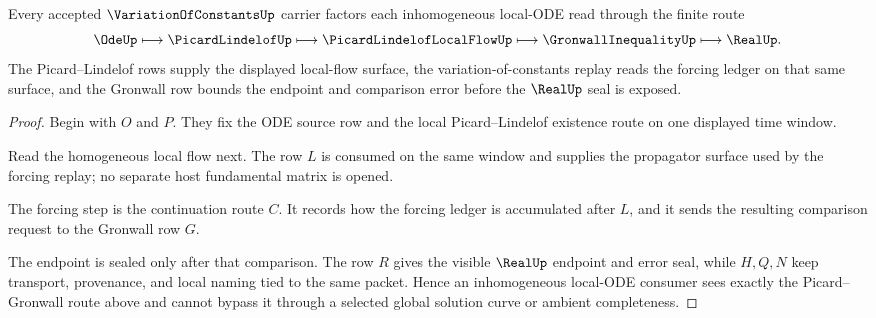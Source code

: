 \begin{theorem}
\label{thm:variation-of-constants-picard-gronwall-handoff}
Every accepted $\VariationOfConstantsUp$ carrier factors each inhomogeneous local-ODE read through the finite route
$$
\OdeUp \longmapsto \PicardLindelofUp \longmapsto \PicardLindelofLocalFlowUp \longmapsto \GronwallInequalityUp \longmapsto \RealUp .
$$
The Picard--Lindelof rows supply the displayed local-flow surface, the variation-of-constants replay reads the forcing ledger on that same surface, and the Gronwall row bounds the endpoint and comparison error before the $\RealUp$ seal is exposed.
\end{theorem}
\begin{proof}
Begin with $O$ and $P$. They fix the ODE source row and the local Picard--Lindelof existence route on one displayed time window.

Read the homogeneous local flow next. The row $L$ is consumed on the same window and supplies the propagator surface used by the forcing replay; no separate host fundamental matrix is opened.

The forcing step is the continuation route $C$. It records how the forcing ledger is accumulated after $L$, and it sends the resulting comparison request to the Gronwall row $G$.

The endpoint is sealed only after that comparison. The row $R$ gives the visible $\RealUp$ endpoint and error seal, while $H,Q,N$ keep transport, provenance, and local naming tied to the same packet. Hence an inhomogeneous local-ODE consumer sees exactly the Picard--Gronwall route above and cannot bypass it through a selected global solution curve or ambient completeness.
\end{proof}

\begin{closurestatus}{\VariationOfConstantsUp}
  \theoryclosure{\seedClosure}
  \formalstatus{\unformalizedV}
\end{closurestatus}
